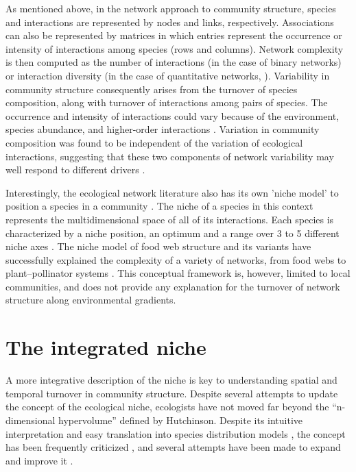 \documentclass[12pt]{article}
\begin{document}
As mentioned above, in the network approach to community structure, species
and interactions are represented by nodes and links, respectively.
Associations can also be represented by matrices in which entries represent
the occurrence or intensity of interactions among species (rows and columns).
Network complexity is then computed as the number of interactions (in the case
of binary networks) or interaction diversity (in the case of quantitative
networks, \citealt{Bersier2002}). Variability in community structure
consequently arises from the turnover of species composition, along with
turnover of interactions among pairs of species. The occurrence and intensity
of interactions could vary because of the environment, species abundance, and
higher-order interactions \citep{Poisot2015a}. Variation in community
composition was found to be independent of the variation of ecological interactions,
suggesting that these two components of network variability may well respond to
different drivers \citep{Poisot2012}.

Interestingly, the ecological network literature also has its own ’niche
model’ to position a species in a community \citep{Williams2000}. The niche of a
species in this context represents the multidimensional space of all of its
interactions. Each species is characterized by a niche position, an optimum
and a range over 3 to 5 different niche axes \citep{Williams2000, Eklof2013}.
The niche model of food web structure and its variants have successfully explained the
complexity of a variety of networks, from food webs to plant–pollinator
systems \citep{Allesina2008, Williams2010, Eklof2013}. This
conceptual framework is, however, limited to local communities, and does not
provide any explanation for the turnover of network structure along
environmental gradients.

\section*{The integrated niche}

A more integrative description of the niche is key to understanding spatial and
temporal turnover in community structure. Despite several attempts to update
the concept of the ecological niche, ecologists have not moved far beyond the
``n-dimensional hypervolume'' defined by Hutchinson. Despite its intuitive
interpretation and easy translation into species distribution models
\citep{Boulangeat2012, Blonder2014}, the concept has been frequently
criticized \citep{Hardin1960, Peters1991, Silvertown2004}, and several
attempts have been made to expand and improve it \citep{Pulliam2000,
Chase2003, Soberon2007, Holt2009, McInerny2012b}.
\end{document}

